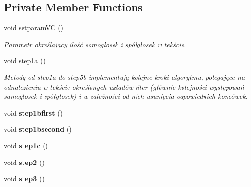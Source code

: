 \subsection*{Private Member Functions}
\begin{DoxyCompactItemize}
\item 
\mbox{\label{class_porter_stemmer_af73f4f625f425b22c1354386d959e10f}} 
void \mbox{\hyperlink{class_porter_stemmer_af73f4f625f425b22c1354386d959e10f}{setparam\+VC}} ()
\begin{DoxyCompactList}\small\item\em Parametr określający ilość samogłosek i spółgłosek w tekście. \end{DoxyCompactList}\item 
\mbox{\label{class_porter_stemmer_ad2a01247e2a9812fceeb08af1ecccff5}} 
void \mbox{\hyperlink{class_porter_stemmer_ad2a01247e2a9812fceeb08af1ecccff5}{step1a}} ()
\begin{DoxyCompactList}\small\item\em Metody od step1a do step5b implementują kolejne kroki algorytmu, polegające na odnalezieniu w tekście określonych układów liter (głównie kolejności występowań samogłosek i spółgłosek) i w zależności od nich usunięcia odpowiednich koncówek. \end{DoxyCompactList}\item 
\mbox{\label{class_porter_stemmer_a34d01dd52d5324433b2b3027c50b226a}} 
void {\bfseries step1bfirst} ()
\item 
\mbox{\label{class_porter_stemmer_a067258e118dfa35182d0788944ef80f7}} 
void {\bfseries step1bsecond} ()
\item 
\mbox{\label{class_porter_stemmer_a4ae90352e22d3038c3d84e6f091a405e}} 
void {\bfseries step1c} ()
\item 
\mbox{\label{class_porter_stemmer_af7d58b5404c12e0260e785bcb38d2df9}} 
void {\bfseries step2} ()
\item 
\mbox{\label{class_porter_stemmer_aecbffa24a804203446faaeca6b57da67}} 
void {\bfseries step3} ()
\item 

\end{DoxyCompactItemize}
